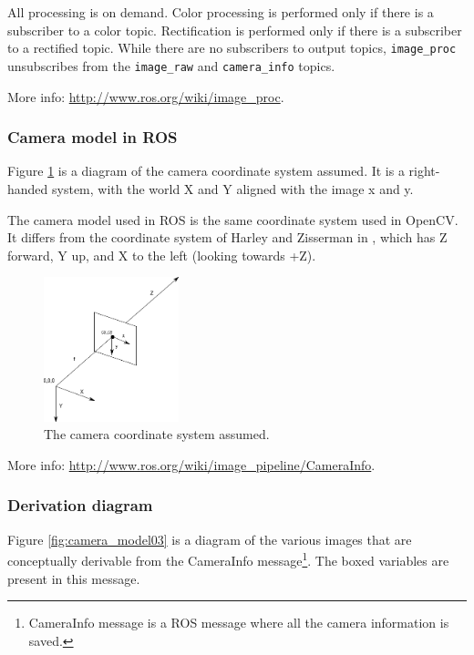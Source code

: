 All processing is on demand. Color processing is performed only if there is a subscriber to a color topic. Rectification is performed only if there is a subscriber to a rectified topic. While there are no subscribers to output topics, \texttt{image\_proc} unsubscribes from the \texttt{image\_raw} and \texttt{camera\_info} topics.

More info: \url{http://www.ros.org/wiki/image_proc}.


\subsubsection{Camera model in ROS}

Figure \ref{fig:camera_model02} is a diagram of the camera coordinate system assumed. It is a right-handed system, with the world X and Y aligned with the image x and y.

The camera model used in ROS is the same coordinate system used in OpenCV. It differs from the coordinate system of Harley and Zisserman in \cite{HZ2}, which has Z forward, Y up, and X to the left (looking towards +Z).

\begin{figure}[!htbp]
 \centering
 \includegraphics[width=0.35\textwidth]{images/camera_model02.png}
 \caption{The camera coordinate system assumed.}
 \label{fig:camera_model02}
\end{figure}

More info: \url{http://www.ros.org/wiki/image_pipeline/CameraInfo}.

\subsubsection{Derivation diagram}

Figure \ref{fig:camera_model03} is a diagram of the various images that are conceptually derivable from the CameraInfo message\footnote{CameraInfo message is a ROS message where all the camera information is saved.}. The boxed variables are present in this message.


